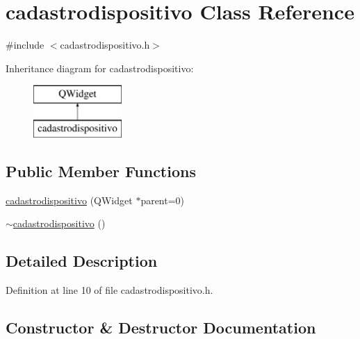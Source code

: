 \hypertarget{classcadastrodispositivo}{}\section{cadastrodispositivo Class Reference}
\label{classcadastrodispositivo}


{\ttfamily \#include $<$cadastrodispositivo.\+h$>$}

Inheritance diagram for cadastrodispositivo\+:\begin{figure}[H]
\begin{center}
\leavevmode
\includegraphics[height=2.000000cm]{classcadastrodispositivo}
\end{center}
\end{figure}
\subsection*{Public Member Functions}
\begin{DoxyCompactItemize}
\item 
\hyperlink{classcadastrodispositivo_a759ec481f21cb002c55d5ca50e8cdf9c}{cadastrodispositivo} (Q\+Widget $\ast$parent=0)
\item 
\hyperlink{classcadastrodispositivo_a21c4cb426f58445706d55dbce57f4aa0}{$\sim$cadastrodispositivo} ()
\end{DoxyCompactItemize}


\subsection{Detailed Description}


Definition at line 10 of file cadastrodispositivo.\+h.



\subsection{Constructor \& Destructor Documentation}
\hypertarget{classcadastrodispositivo_a759ec481f21cb002c55d5ca50e8cdf9c}{}\label{classcadastrodispositivo_a759ec481f21cb002c55d5ca50e8cdf9c} 
